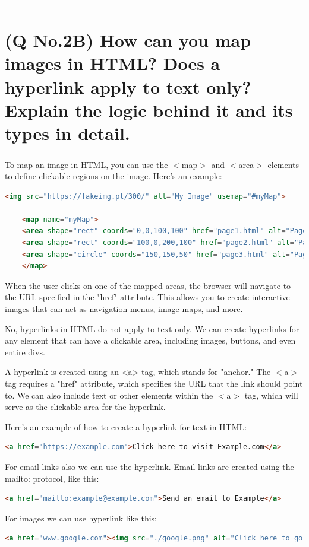 \documentclass[11pt]{article}
\begin{document}
\noindent\rule{\linewidth}{0.4pt}
\section{(Q No.2B) How can you map images in HTML? Does a hyperlink apply to text only? Explain the logic behind it and its types in detail.}
\subparagraph{}
To map an image in HTML, you can use the $<$map$>$ and $<$area$>$ elements to define clickable regions on the image. Here's an example:
\begin{lstlisting}[language=html, caption={Image map}]
    <img src="https://fakeimg.pl/300/" alt="My Image" usemap="#myMap">

    <map name="myMap">
    <area shape="rect" coords="0,0,100,100" href="page1.html" alt="Page 1">
    <area shape="rect" coords="100,0,200,100" href="page2.html" alt="Page 2">
    <area shape="circle" coords="150,150,50" href="page3.html" alt="Page 3">
    </map>
\end{lstlisting}
When the user clicks on one of the mapped areas, the browser will navigate to the URL specified in the "href" attribute. This allows you to create interactive images that can act as navigation menus, image maps, and more.

No, hyperlinks in HTML do not apply to text only. We can create hyperlinks for any element that can have a clickable area, including images, buttons, and even entire divs.

A hyperlink is created using an <a> tag, which stands for "anchor." The $<$a$>$ tag requires a "href" attribute, which specifies the URL that the link should point to. We can also include text or other elements within the $<$a$>$ tag, which will serve as the clickable area for the hyperlink.

Here's an example of how to create a hyperlink for text in HTML:
\begin{lstlisting}[language=html]
    <a href="https://example.com">Click here to visit Example.com</a>
\end{lstlisting}

For email links also we can use the hyperlink. Email links are created using the mailto: protocol, like this:
\begin{lstlisting}[language=html]
    <a href="mailto:example@example.com">Send an email to Example</a>
\end{lstlisting}

For images we can use hyperlink like this:
\begin{lstlisting}[language=html]
    <a href="www.google.com"><img src="./google.png" alt="Click here to go to google"> </a>
\end{lstlisting}
\end{document}
